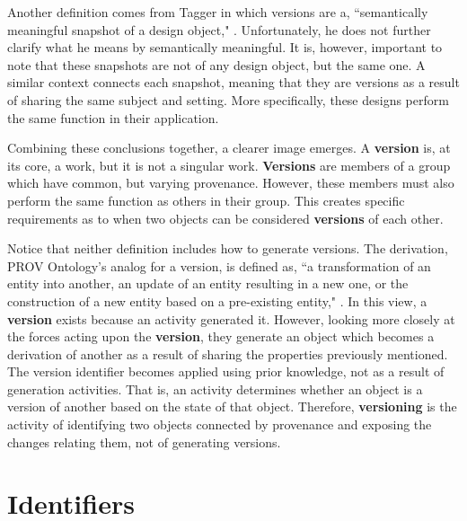 Another definition comes from Tagger in which versions are a, ``semantically meaningful snapshot of a design object," \cite{Tagger2005}.
Unfortunately, he does not further clarify what he means by semantically meaningful.
It is, however, important to note that these snapshots are not of any design object, but the same one.
A similar context connects each snapshot, meaning that they are versions as a result of sharing the same subject and setting.
More specifically, these designs perform the same function in their application.

Combining these conclusions together, a clearer image emerges.
A \textbf{version} is, at its core, a work, but it is not a singular work.
\textbf{Versions} are members of a group which have common, but varying provenance.
However, these members must also perform the same function as others in their group.
This creates specific requirements as to when two objects can be considered \textbf{versions} of each other.

Notice that neither definition includes how to generate versions.
The derivation, PROV Ontology's analog for a version, is defined as, ``a transformation of an entity into another, an update of an entity resulting in a new one, or the construction of a new entity based on a pre-existing entity," \cite{Lebo2013}.
In this view, a \textbf{version} exists because an activity generated it.
However, looking more closely at the forces acting upon the \textbf{version}, they generate an object which becomes a derivation of another as a result of sharing the properties previously mentioned.
The version identifier becomes applied using prior knowledge, not as a result of generation activities.
That is, an activity determines whether an object is a version of another based on the state of that object.
Therefore, \textbf{versioning} is the activity of identifying two objects connected by provenance and exposing the changes relating them, not of generating versions.

\section{Identifiers}

